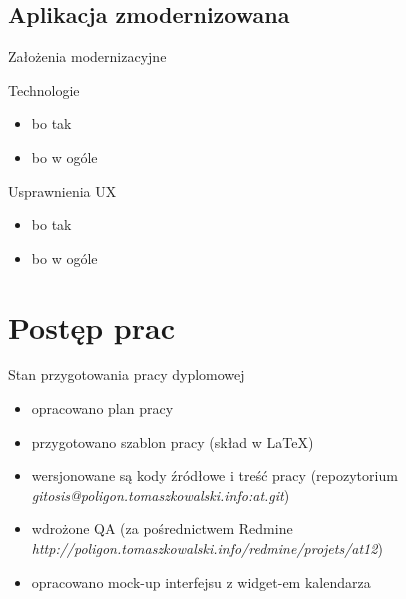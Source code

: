 \subsection{Aplikacja zmodernizowana}

\begin{frame}{Założenia modernizacyjne}
    \begin{block}{Technologie}
        \begin{itemize}
        \item bo tak
        \item bo w ogóle
        \end{itemize}
    \end{block}

    \begin{block}{Usprawnienia UX}
        \begin{itemize}
        \item bo tak
        \item bo w ogóle
        \end{itemize}
    \end{block}
\end{frame}

\section{Postęp prac}

\begin{frame}{Stan przygotowania pracy dyplomowej}
    \begin{itemize}
    \item opracowano plan pracy
    \item przygotowano szablon pracy (skład w \LaTeX)
    \item wersjonowane są kody źródłowe i treść pracy 
          {\footnotesize (repozytorium \textsl{gitosis@poligon.tomaszkowalski.info:at.git}) }
    \item wdrożone QA {\footnotesize (za pośrednictwem Redmine \textsl{http://poligon.tomaszkowalski.info/redmine/projets/at12}) }
    \item opracowano mock-up interfejsu z widget-em kalendarza
    \end{itemize}
\end{frame}


